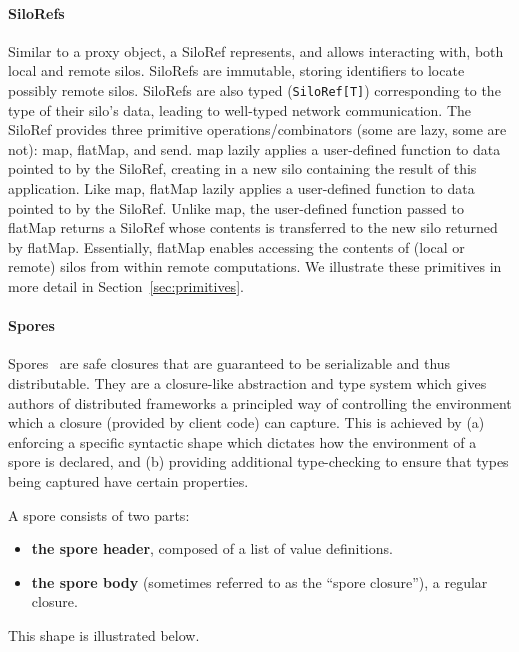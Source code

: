 \documentclass[preprint]{sigplanconf}
\theoremstyle{definition}
\theoremstyle{definition}
\begin{document}
\paragraph{SiloRefs}
Similar to a proxy object, a SiloRef represents, and allows interacting with,
both local and remote silos. SiloRefs are immutable, storing identifiers to
locate possibly remote silos. SiloRefs are also typed (\verb|SiloRef[T]|)
corresponding to the type of their silo's data, leading to well-typed network
communication. The SiloRef provides three primitive operations/combinators
(some are lazy, some are not): map, flatMap, and send. map lazily applies a
user-defined function to data pointed to by the SiloRef, creating in a new
silo containing the result of this application. Like map, flatMap lazily
applies a user-defined function to data pointed to by the SiloRef. Unlike map,
the user-defined function passed to flatMap returns a SiloRef whose contents
is transferred to the new silo returned by flatMap. Essentially, flatMap
enables accessing the contents of (local or remote) silos from within remote
computations. We illustrate these primitives in more detail in Section~\ref{sec:primitives}.

\paragraph{Spores}

Spores~\cite{Spores} are safe closures that are guaranteed to be serializable
and thus distributable. They are a closure-like abstraction and type system
which gives authors of distributed frameworks a principled way of controlling
the environment which a closure (provided by client code) can capture. This is
achieved by (a) enforcing a specific syntactic shape which dictates how the
environment of a spore is declared, and (b) providing additional type-checking
to ensure that types being captured have certain properties.

\vspace{3mm}
\noindent A spore consists of two parts:

\begin{itemize}[noitemsep]
\item {\bf the spore header}, composed of a list of value definitions.
\item {\bf the spore body} (sometimes referred to as the “spore closure”), a regular closure.
\end{itemize}

\noindent This shape is illustrated below.
\end{document}
